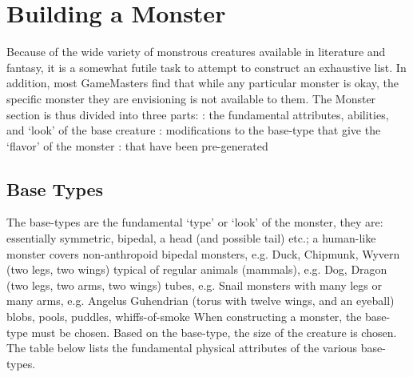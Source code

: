 \documentclass[twoside]{book}
\begin{document}
\section{Building a Monster}
     Because of the wide variety of monstrous creatures
             available in literature and fantasy, it is a somewhat futile
             task to attempt to construct an exhaustive list. In
             addition, most GameMasters find that while any particular
             monster is okay, the specific monster they are envisioning
             is not available to them. The Monster section is thus
             divided into three parts:   
               : the fundamental
               attributes, abilities, and `look' of the base
               creature 
               : modifications to the
               base-type that give the `flavor' of the
               monster 
               : that have been
               pre-generated 
          
\subsection{Base Types}
     The base-types are the fundamental
               `type' or `look' of the monster,
               they are:   
                  essentially symmetric,
                 bipedal, a head (and possible tail) etc.; a human-like
                 monster 
                  covers non-anthropoid
                 bipedal monsters, e.g. Duck, Chipmunk, Wyvern (two legs,
                 two wings) 
                  typical of regular
                 animals (mammals), e.g. Dog, Dragon (two legs, two arms,
                 two wings) 
                tubes, e.g. Snail   
                  monsters with many legs
                 or many arms, e.g. Angelus Guhendrian (torus with twelve
                 wings, and an eyeball) 
                  blobs, pools, puddles,
                 whiffs-of-smoke 
             When constructing a monster, the base-type must be
               chosen. Based on the base-type, the size of the creature
               is chosen. The table below lists the fundamental physical
               attributes of the various base-types.   
                
                  
                    
                    
                    
                    
                    
                    
                    
\end{document}
